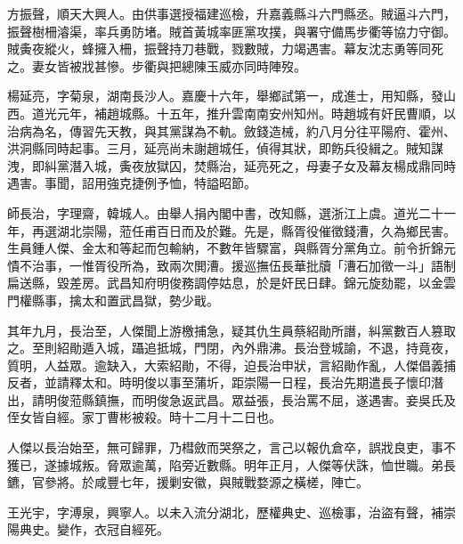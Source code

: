 \begin{pinyinscope}
方振聲，順天大興人。由供事選授福建巡檢，升嘉義縣斗六門縣丞。賊逼斗六門，振聲樹柵濬渠，率兵勇防堵。賊首黃城率匪黨攻撲，與署守備馬步衢等協力守御。賊夤夜縱火，蜂擁入柵，振聲持刀巷戰，戮數賊，力竭遇害。幕友沈志勇等同死之。妻女皆被戕甚慘。步衢與把總陳玉威亦同時陣歿。

楊延亮，字菊泉，湖南長沙人。嘉慶十六年，舉鄉試第一，成進士，用知縣，發山西。道光元年，補趙城縣。十五年，推升雲南南安州知州。時趙城有奸民曹順，以治病為名，傳習先天教，與其黨謀為不軌。斂錢造械，約八月分往平陽府、霍州、洪洞縣同時起事。三月，延亮尚未謝趙城任，偵得其狀，即飭兵役緝之。賊知謀洩，即糾黨潛入城，夤夜放獄囚，焚縣治，延亮死之，母妻子女及幕友楊成鼎同時遇害。事聞，詔用強克捷例予恤，特謚昭節。

師長治，字理齋，韓城人。由舉人捐內閣中書，改知縣，選浙江上虞。道光二十一年，再選湖北崇陽，蒞任甫百日而及於難。先是，縣胥役催徵錢漕，久為鄉民害。生員鍾人傑、金太和等起而包輸納，不數年皆驟富，與縣胥分黨角立。前令折錦元憒不治事，一惟胥役所為，致兩次閧漕。援巡撫伍長華批牘「漕石加徵一斗」語制扁送縣，毀差房。武昌知府明俊務調停姑息，於是奸民日肆。錦元旋劾罷，以金雲門權縣事，擒太和置武昌獄，勢少戢。

其年九月，長治至，人傑聞上游檄捕急，疑其仇生員蔡紹勛所譖，糾黨數百人篡取之。至則紹勛遁入城，躡追抵城，門閉，內外鼎沸。長治登城諭，不退，持竟夜，質明，人益眾。逾缺入，大索紹勛，不得，迫長治申狀，言紹勛作亂，人傑倡義捕反者，並請釋太和。時明俊以事至蒲圻，距崇陽一日程，長治先期遣長子懷印潛出，請明俊蒞縣鎮撫，而明俊急返武昌。眾益張，長治罵不屈，遂遇害。妾吳氏及侄女皆自經。家丁曹彬被殺。時十二月十二日也。

人傑以長治始至，無可歸罪，乃槥斂而哭祭之，言己以報仇倉卒，誤戕良吏，事不獲已，遂據城叛。脅眾逾萬，陷旁近數縣。明年正月，人傑等伏誅，恤世職。弟長鑣，官參將。於咸豐七年，援剿安徽，與賊戰婺源之橫槎，陣亡。

王光宇，字溥泉，興寧人。以未入流分湖北，歷權典史、巡檢事，治盜有聲，補崇陽典史。變作，衣冠自經死。


\end{pinyinscope}